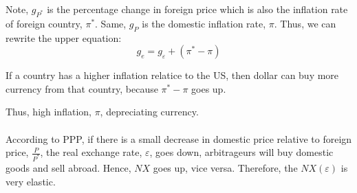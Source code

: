 \documentclass[12pt]{article}
\begin{document}
Note, $ g_{P^{*}} $ is the percentage change in foreign price which is also the
inflation rate of foreign country, $ \pi^{*} $. Same, $ g_{P} $ is the domestic 
inflation rate, $ \pi $. Thus, we can rewrite the upper equation:
\begin{equation*}
g_{e} = g_{\varepsilon} + (\pi^{*} - \pi)
\end{equation*}

If a country has a higher inflation relatice to the US, then dollar can buy more
currency from that country, because $ \pi^{*} - \pi $ goes up.

Thus, high inflation, $ \pi $, depreciating currency.\\

\noindent{}\\


According to PPP, if there is a small decrease in domestic price relative to foreign
price, $ \frac{P}{P^{*}} $, the real exchange rate, $ \varepsilon $, goes down,
arbitrageurs will buy domestic goods and sell abroad. Hence, $ NX $ goes up, vice
versa.
Therefore, the $ NX(\varepsilon) $ is very elastic.

\begin{figure}[H]
\end{figure}
\end{document}
